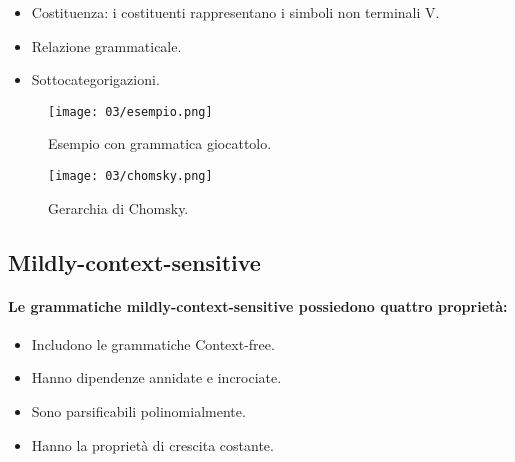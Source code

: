 \begin{itemize}
  \item Costituenza: i costituenti rappresentano i simboli non terminali V. 
  \item Relazione grammaticale. 
  \item Sottocategorigazioni.
\end{itemize}


\begin{figure}[h]
    \centering
    \texttt{[image: 03/esempio.png]}
    \caption{Esempio con grammatica giocattolo.}
\end{figure}

\begin{figure}[h]
    \centering
    \texttt{[image: 03/chomsky.png]}
    \caption{Gerarchia di Chomsky.}
\end{figure}


\subsection{Mildly-context-sensitive}

\paragraph{Le grammatiche mildly-context-sensitive possiedono quattro proprietà:}

\begin{itemize}
  \item Includono le grammatiche Context-free. 
  \item Hanno dipendenze annidate e incrociate. 
  \item Sono parsificabili polinomialmente. 
  \item Hanno la proprietà di crescita costante.
\end{itemize}


